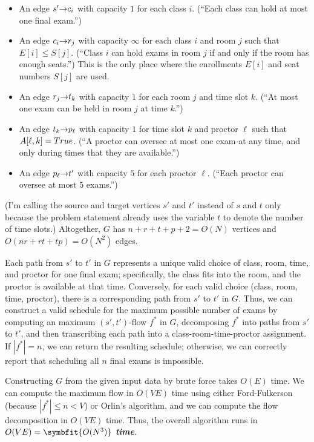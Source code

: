 \begin{itemize}
\item An edge $s'\mathord{\rightarrow}c_i$ with capacity $1$ for each class $i$. (“Each class can hold at most one final exam.”)
\item An edge $c_i\mathord{\rightarrow}r_j$ with capacity $\infty$ for each class $i$ and room $j$ such that $E[i] \le S[j]$. (“Class $i$ can hold exams in room $j$ if and only if the room has enough seats.”) This is the only place where the enrollments $E[i]$ and seat numbers $S[j]$ are used.
\item An edge $r_j\mathord{\rightarrow}t_k$ with capacity $1$ for each room $j$ and time slot $k$. (“At most one exam can be held in room $j$ at time $k$.”)
\item An edge $t_k\mathord{\rightarrow}p_\ell$ with capacity $1$ for time slot $k$ and proctor $\ell$ such that $A[\ell,k] = True$. (“A proctor can oversee at most one exam at any time, and only during times that they are available.”)
\item An edge $p_\ell\mathord{\rightarrow}t'$ with capacity $5$ for each proctor $\ell$. (“Each proctor can oversee at most $5$ exams.”)
\end{itemize}
\noindent (I’m calling the source and target vertices $s'$ and $t'$ instead of $s$ and $t$ only because the problem statement already uses the variable $t$ to denote the number of time slots.)
Altogether, $G$ has $n + r + t + p + 2 = O(N)$ vertices and $O(nr + rt + tp) = O(N^2)$ edges.

Each path from $s'$ to $t'$ in $G$ represents a unique valid choice of class, room, time, and proctor for one final exam; specifically, the class fits into the room, and the proctor is available at that time.
Conversely, for each valid choice (class, room, time, proctor), there is a corresponding path from $s'$ to $t'$ in $G$.
Thus, we can construct a valid schedule for the maximum possible number of exams by computing an maximum $(s',t')$-flow $f^*$ in $G$, decomposing $f^*$ into paths from $s'$ to $t'$, and then transcribing each path into a class-room-time-proctor assignment.
If $|f^*| = n$, we can return the resulting schedule; otherwise, we can correctly report that scheduling all $n$ final exams is impossible.

Constructing $G$ from the given input data by brute force takes $O(E)$ time.
We can compute the maximum flow in $O(VE)$ time using either Ford-Fulkerson (because $|f^*| \le n < V$) or Orlin’s algorithm, and we can compute the flow decomposition in $O(VE)$ time.
Thus, the overall algorithm runs in $O(VE) = \symbfit{O(N^3)}$ \textbf{\textit{time}}.

